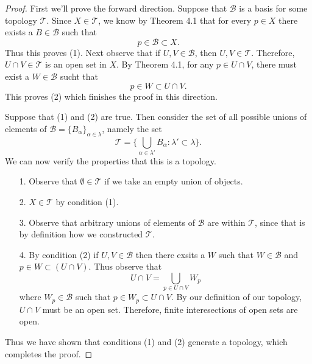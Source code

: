 \documentclass[a4paper,12pt,twoside]{hmcpset}
\begin{document}
\begin{proof}
    First we'll prove the forward direction. 
    Suppose that $\mathscr{B}$ is a basis for some topology
    $\mathscr{T}$. Since $X \in \mathscr{T}$, we know by Theorem 4.1
    that for every $p \in X$ there exists a $B \in \mathscr{B}$ such
    that 
    \[
    p \in \mathscr{B} \subset X.    
    \]
    Thus this proves (1).
    Next observe that if $U, V \in \mathscr{B}$, then $U, V \in 
    \mathscr{T}$. Therefore, $U \cap V \in \mathscr{T}$ is an open set
    in $X$. By Theorem 4.1, for any $p \in U \cap V$, there must exist
    a $W \in \mathscr{B}$ sucht that 
    \[
      p \in W \subset U \cap V.  
    \]
    This proves (2) which finishes the proof in this direction.
    
    
    
    Suppose that (1) and (2)
    are true. Then consider the set of all possible unions of elements
    of $\mathscr{B} = \{B_\alpha\}_{\alpha \in \lambda}$, namely the
    set 
    $$
    \mathscr{T} = \{\bigcup\limits_{\alpha \in \lambda'} B_{\alpha} :
     \lambda'\subset \lambda\}.
    $$ 
    We can now verify the properties that this is a topology.
    \begin{itemize}
        \item[1.] Observe that $\emptyset \in \mathscr{T}$
        if we take an empty union of objects. 

        \item[2.] $X
        \in \mathscr{T}$ by condition (1).

        \item[3.] Observe that arbitrary unions of
        elements of $\mathscr{B}$ are within $\mathscr{T}$, since that is
        by definition how we constructed $\mathscr{T}$.

        \item[4.] By condition (2) if $U, V \in \mathscr{B}$ 
        then there exsits
        a $W$ such that $W \in \mathscr{B}$ and $p \in W \subset (U \cap
        V)$. Thus observe that  
        \[
          U \cap V = \bigcup\limits_{p \in U \cap V} W_p 
        \]  
        where $W_p \in \mathscr{B}$ such that $p \in W_p \subset U
        \cap V$. By our definition of our topology, $U \cap V$ must be
        an open set. Therefore, finite interesections of open sets are open.

    \end{itemize}
    Thus we have shown that conditions (1) and (2) generate a
    topology, which completes the proof.

\end{proof}
\end{document}
